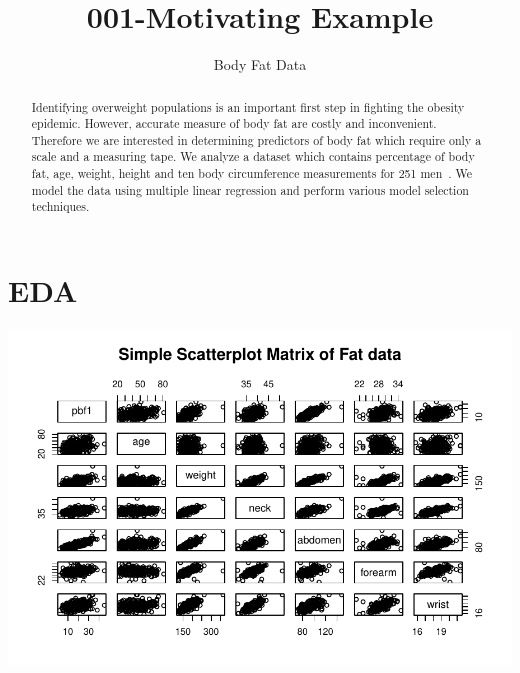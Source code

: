 \documentclass[11pt,letter]{article}\usepackage[]{graphicx}\usepackage[]{color}
\makeatletter
\def\maxwidth{ %
  \ifdim\Gin@nat@width>\linewidth
    \linewidth
  \else
    \Gin@nat@width
  \fi
}
\newenvironment{knitrout}{}{} %
\makeatother
\begin{document}
\pagestyle{fancy}

\title{001-Motivating Example}
\author{Body Fat Data}
\maketitle







\begin{abstract}
Identifying overweight populations is an important first step in fighting the obesity epidemic. However, accurate measure of body fat are costly and inconvenient. Therefore we are interested in determining predictors of body fat which require only a scale and a measuring tape. We analyze a dataset which contains percentage of body fat, age, weight, height and ten body circumference measurements for 251 men~\citep{penrose1985generalized,johnson1996fitting,mfp}. We model the data using multiple linear regression and perform various model selection techniques.
\end{abstract}


\section{EDA}



\begin{knitrout}
\color{fgcolor}

{\centering \includegraphics[width=\maxwidth]{figure/fig-pairs-1} 

}



\end{knitrout}
\end{document}
